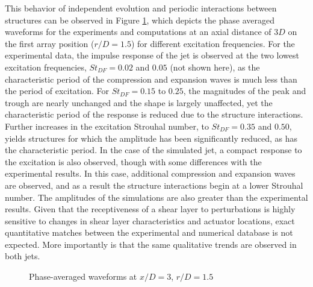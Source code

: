 \documentclass[english]{aiaa-tc}
\begin{document}
This behavior of independent evolution and periodic interactions between structures can be observed in Figure \ref{phase}, which depicts the phase averaged waveforms for the experiments and computations at an axial distance of $3D$ on the first array position ($r/D=1.5$) for different excitation frequencies. For the experimental data, the impulse response of the jet is observed at the two lowest excitation frequencies, $St_{DF} = 0.02$ and $0.05$ (not shown here), as the characteristic period of the compression and expansion waves is much less than the period of excitation. For $St_{DF} = 0.15$ to $0.25$, the magnitudes of the peak and trough are nearly unchanged and the shape is largely unaffected, yet the characteristic period of the response is reduced due to the structure interactions. Further increases in the excitation Strouhal number, to $St_{DF} = 0.35$ and $0.50$, yields structures for which the amplitude has been significantly reduced, as has the characteristic period. In the case of the simulated jet, a compact response to the excitation is also observed, though with some differences with the experimental results. In this case, additional compression and expansion waves are observed, and as a result the structure interactions begin at a lower Strouhal number. The amplitudes of the simulations are also greater than the experimental results. Given that the receptiveness of a shear layer to perturbations is highly sensitive to changes in shear layer characteristics and actuator locations, exact quantitative matches between the experimental and numerical database is not expected. More importantly is that the same qualitative trends are observed in both jets. 
\begin{figure}
\centering{}\caption{Phase-averaged waveforms at $x/D = 3$, $r/D = 1.5$}\label{phase}
\end{figure}
\end{document}
